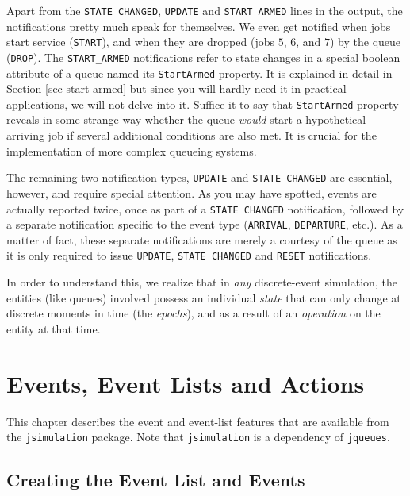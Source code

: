 \documentclass[12pt]{book}
\begin{document}
Apart from the \lstinline-STATE CHANGED-, \lstinline-UPDATE-
  and \lstinline-START_ARMED- lines in the output,
  the notifications pretty much speak for themselves.
We even get notified when jobs start service (\lstinline-START-),
  and when they are dropped (jobs $5$, $6$, and $7$)
  by the queue (\lstinline -DROP-).
The \lstinline-START_ARMED- notifications
  refer to state changes in a special boolean attribute of a
  queue named its \lstinline-StartArmed- property.
It is explained in detail in Section \ref{sec-start-armed}
  but since you will hardly need it in practical applications,
  we will not delve into it.
Suffice it to say that \lstinline|StartArmed| property
  reveals in some strange way
  whether the queue {\em would\/}
  start a hypothetical arriving job
  if several additional conditions are also met.
It is crucial for the implementation
  of more complex queueing systems.

The remaining two notification types, \lstinline|UPDATE| and \lstinline|STATE CHANGED|
  are essential, however, and require special attention.
As you may have spotted,
  events are actually reported twice,
  once as part of a \lstinline|STATE CHANGED| notification,
  followed by a separate notification specific to the event type
  (\lstinline-ARRIVAL-, \lstinline-DEPARTURE-, etc.).
As a matter of fact, these separate notifications are merely a courtesy
  of the queue as it is only required to issue
  \lstinline|UPDATE|, \lstinline|STATE CHANGED| and \lstinline|RESET| notifications.

In order to understand this, we realize that in {\em any\/} discrete-event simulation,
  the entities (like queues) involved possess an individual {\em state\/}
  that can only change at discrete moments in time (the {\em epochs\/}),
  and as a result of an {\em operation\/} on the entity at that time.

\chapter{Events, Event Lists and Actions}

This chapter describes the event and event-list features
  that are available from the \lstinline{jsimulation} package.
Note that \lstinline{jsimulation} is a dependency of \lstinline{jqueues}.

\section{Creating the Event List and Events}
\end{document}
